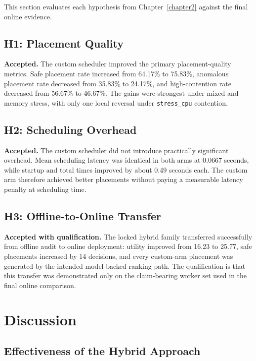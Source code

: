 This section evaluates each hypothesis from Chapter~\ref{chapter2} against the final online evidence.

\subsection{H1: Placement Quality}

\textbf{Accepted.} The custom scheduler improved the primary placement-quality metrics. Safe placement rate increased from 64.17\% to 75.83\%, anomalous placement rate decreased from 35.83\% to 24.17\%, and high-contention rate decreased from 56.67\% to 46.67\%. The gains were strongest under mixed and memory stress, with only one local reversal under \texttt{stress\_cpu} contention.


\subsection{H2: Scheduling Overhead}

\textbf{Accepted.} The custom scheduler did not introduce practically significant overhead. Mean scheduling latency was identical in both arms at 0.0667 seconds, while startup and total times improved by about 0.49 seconds each. The custom arm therefore achieved better placements without paying a measurable latency penalty at scheduling time.


\subsection{H3: Offline-to-Online Transfer}

\textbf{Accepted with qualification.} The locked hybrid family transferred successfully from offline audit to online deployment: utility improved from 16.23 to 25.77, safe placements increased by 14 decisions, and every custom-arm placement was generated by the intended model-backed ranking path. The qualification is that this transfer was demonstrated only on the claim-bearing worker set used in the final online comparison.


\section{Discussion}
\label{sec:discussion}

\subsection{Effectiveness of the Hybrid Approach}

